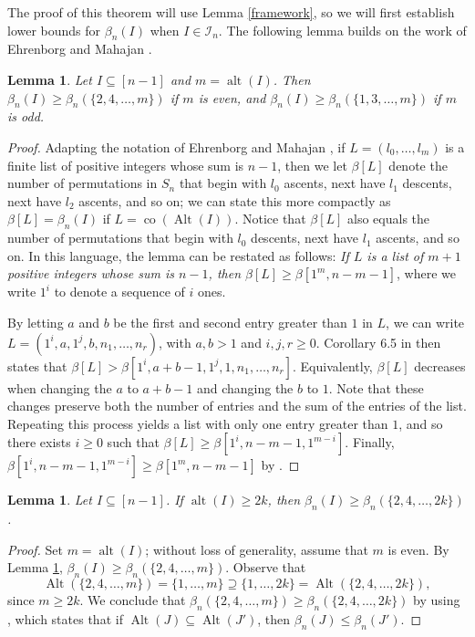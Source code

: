 \documentclass[12pt]{article}
\newcommand{\Perm}{S}
\DeclareMathOperator{\co}{co}
\DeclareMathOperator{\Alt}{Alt}
\DeclareMathOperator{\alt}{alt}
\newtheorem{lem}[thm]{Lemma}
\theoremstyle{definition}
\begin{document}
The proof of this theorem will use Lemma \ref{framework}, so we will first establish lower bounds for $\beta_n(I)$ when $I\in\mathcal{I}_n$. The following lemma builds on the work of Ehrenborg and Mahajan \cite{EM}.

\begin{lem} \label{minimizing} Let $I \subseteq [n-1]$ and $m = \alt(I)$. Then $\beta_n(I) \ge \beta_n(\{2, 4, \ldots, m\})$ if $m$ is even, and $\beta_n(I) \ge \beta_n(\{1, 3, \ldots, m\})$ if $m$ is odd.
\end{lem}

\begin{proof}
Adapting the notation of Ehrenborg and Mahajan \cite{EM}, if $L = (l_0, \ldots, l_m)$ is a finite list of positive integers whose sum is $n-1$, then we let $\beta[L]$ denote the number of permutations in $\Perm_n$ that begin with $l_0$ ascents, next have $l_1$ descents, next have $l_2$ ascents, and so on; we can state this more compactly as $\beta[L] = \beta_n(I)$ if $L = \co(\Alt(I))$. Notice that $\beta[L]$ also equals the number of permutations that begin with $l_0$ descents, next have $l_1$ ascents, and so on. In this language, the lemma can be restated as follows: \emph{If $L$ is a list of $m+1$ positive integers whose sum is $n-1$, then $\beta[L] \ge \beta[1^m, n-m-1]$}, where we write $1^i$ to denote a sequence of $i$ ones.

By letting $a$ and $b$ be the first and second entry greater than $1$ in $L$, we can write $L = (1^i, a, 1^j, b, n_1, \ldots, n_r)$, with $a,b > 1$ and $i,j,r \ge 0$. Corollary 6.5 in \cite{EM} then states that $\beta[L] > \beta[1^i, a+b-1, 1^j, 1, n_1, \ldots, n_r]$. Equivalently, $\beta[L]$ decreases when changing the $a$ to $a+b-1$ and changing the $b$ to $1$. Note that these changes preserve both the number of entries and the sum of the entries of the list. Repeating this process yields a list with only one entry greater than $1$, and so there exists $i\ge0$ such that $\beta[L] \ge \beta[1^i, n-m-1, 1^{m-i}]$.
Finally, $\beta[1^i, n-m-1, 1^{m-i}] \ge \beta[1^m, n-m-1]$ by \cite[Thm. 5.4]{EM}.
\end{proof}


\begin{lem} \label{minimizing2}
Let $I \subseteq [n-1]$. If $\alt(I) \ge 2k$, then $\beta_n(I) \ge \beta_n(\{2, 4, \ldots, 2k\})$.
\end{lem}

\begin{proof}
Set $m = \alt(I)$; without loss of generality, assume that $m$ is even. By Lemma \ref{minimizing}, $\beta_n(I) \ge \beta_n(\{2, 4, \ldots, m\})$. Observe that $$\Alt(\{2, 4, \ldots, m\}) = \{1, \ldots, m\} \supseteq  \{1, \ldots, 2k\} =\Alt(\{2,4,\ldots,2k\}),$$
since $m \ge 2k$. We conclude that $\beta_n(\{2,4,\ldots, m\}) \ge \beta_n(\{2, 4, \ldots, 2k\})$ by using \cite[Prop.\ 1.6.4]{Stanley1}, which states that if $\Alt(J) \subseteq \Alt(J')$, then $\beta_n(J) \le \beta_n(J')$.
\end{proof}
\end{document}
